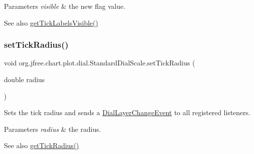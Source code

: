 \begin{DoxyParams}{Parameters}
{\em visible} & the new flag value.\\
\hline
\end{DoxyParams}
\begin{DoxySeeAlso}{See also}
\mbox{\hyperlink{classorg_1_1jfree_1_1chart_1_1plot_1_1dial_1_1_standard_dial_scale_af28005e1d3f175d9fb695830299d9852}{get\+Tick\+Labels\+Visible()}} 
\end{DoxySeeAlso}
\mbox{\label{classorg_1_1jfree_1_1chart_1_1plot_1_1dial_1_1_standard_dial_scale_aeb6083a6e71773a81579db3412a73a9b}} 
\subsubsection{\texorpdfstring{set\+Tick\+Radius()}{setTickRadius()}}
{\footnotesize\ttfamily void org.\+jfree.\+chart.\+plot.\+dial.\+Standard\+Dial\+Scale.\+set\+Tick\+Radius (\begin{DoxyParamCaption}\item[{double}]{radius }\end{DoxyParamCaption})}

Sets the tick radius and sends a \mbox{\hyperlink{classorg_1_1jfree_1_1chart_1_1plot_1_1dial_1_1_dial_layer_change_event}{Dial\+Layer\+Change\+Event}} to all registered listeners.


\begin{DoxyParams}{Parameters}
{\em radius} & the radius.\\
\hline
\end{DoxyParams}
\begin{DoxySeeAlso}{See also}
\mbox{\hyperlink{classorg_1_1jfree_1_1chart_1_1plot_1_1dial_1_1_standard_dial_scale_a6180a42bb175a95a1636ae3d050f3983}{get\+Tick\+Radius()}} 
\end{DoxySeeAlso}
\mbox{\label{classorg_1_1jfree_1_1chart_1_1plot_1_1dial_1_1_standard_dial_scale_ae26419137b686bc872cc0c78f8c17c3d}} 
